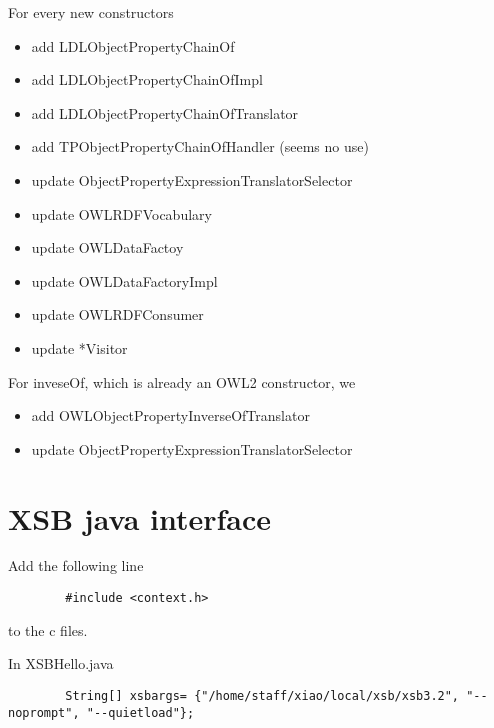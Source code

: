 \documentclass{article}
\begin{document}
	For every new constructors
	
	\begin{itemize}
      \item add LDLObjectPropertyChainOf
      \item add LDLObjectPropertyChainOfImpl
      \item add LDLObjectPropertyChainOfTranslator 
      \item add TPObjectPropertyChainOfHandler (seems no use)
      \item update ObjectPropertyExpressionTranslatorSelector
      \item update OWLRDFVocabulary
      \item update OWLDataFactoy
      \item update OWLDataFactoryImpl
      \item update OWLRDFConsumer      
      \item update *Visitor
    \end{itemize}
	
	For inveseOf, which is already an OWL2 constructor, we 	
	\begin{itemize}
      \item add OWLObjectPropertyInverseOfTranslator
      \item update ObjectPropertyExpressionTranslatorSelector
    \end{itemize}
	
	
	\section{XSB java interface}
	
	
	Add the following line
	\begin{verbatim}
		#include <context.h>
	\end{verbatim}
	to the c files.
	
	In XSBHello.java
	\begin{verbatim}
    	String[] xsbargs= {"/home/staff/xiao/local/xsb/xsb3.2", "--noprompt", "--quietload"};
    \end{verbatim}
	
	
	
	
	
	
\end{document}
